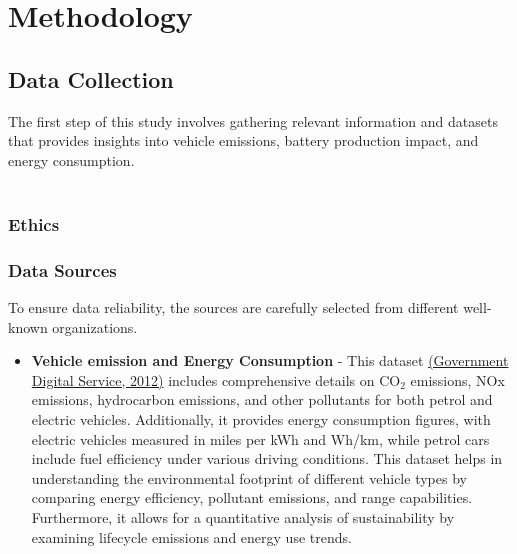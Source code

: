 \chapter{Methodology}
\label{ch:method} %




\section{Data Collection}
 The first step of this study involves gathering relevant information and datasets that provides insights into vehicle emissions, battery production impact, and energy consumption. \\ 
\\


\subsection{Ethics}
\subsection{Data Sources}



 To ensure data reliability, the sources are carefully selected from different well-known organizations. 
 \begin{itemize}
     \item \textbf{Vehicle emission and Energy Consumption} - This dataset \href{https://www.gov.uk/co2-and-vehicle-tax-tools}{(Government Digital Service, 2012)} includes comprehensive details on CO$_2$ emissions, NOx emissions, hydrocarbon emissions, and other pollutants for both petrol and electric vehicles. Additionally, it provides energy consumption figures, with electric vehicles measured in miles per kWh and Wh/km, while petrol cars include fuel efficiency under various driving conditions. This dataset helps in understanding the environmental footprint of different vehicle types by comparing energy efficiency, pollutant emissions, and range capabilities. Furthermore, it allows for a quantitative analysis of sustainability by examining lifecycle emissions and energy use trends.
 \end{itemize}

